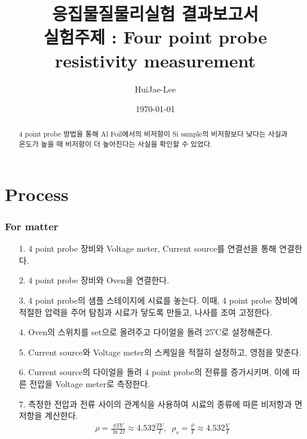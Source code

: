 \documentclass[aps,reprint,superscriptaddress,10pt]{revtex4-2}
\begin{document}
\title{응집물질물리실험 결과보고서 \\
\small 실험주제 : Four point probe resistivity
measurement}

\author{HuiJae-Lee}

\date{\today}

\begin{abstract}
4  point probe 방법을 통해 Al Foil에서의 비저항이 Si sample의 비저항보다 낮다는
사실과 온도가 높을 때 비저항이 더 높아진다는 사실을 확인할 수 있었다.
  \end{abstract}

 \maketitle
 
 \section{Process}
 \subsubsection{For matter}
 \begin{itemize}
     \item[1. ]
     4 point probe 장비와 Voltage meter, Current source를 연결선을 통해 연결한다.
     \item[2. ]
     4 point probe 장비와 Oven을 연결한다.
     \item[3. ]
     4 point probe의 샘플 스테이지에 시료를 놓는다. 이때, 4 point probe 장비에 
     적절한 압력을 주어 탐침과 시료가 닿도록 만들고, 나사를 조여 고정한다. 
     \item[4. ]
     Oven의 스위치를 set으로 올려주고 다이얼을 돌려 25℃로 설정해준다.
     \item[5. ]
     Current source와 Voltage meter의 스케일을 적절히 설정하고, 영점을 맞춘다.
     \item[6. ]
     Current source의 다이얼을 돌려 4 point probe의 전류를 증가시키며, 
     이에 따른 전압을 Voltage meter로 측정한다.
     \item[7. ] 
     측정한 전압과 전류 사이의 관계식을 사용하여 시료의 종류에 
     따른 비저항과 면저항을 계산한다. 
     \begin{align}
         \rho = \frac{\pi TV}{\ln{2I}}\approx 4.532\frac{TV}{I},\,\,\,
         \rho_s = \frac{\rho}{T}\approx 4.532\frac{V}{I}
     \end{align}
 
 \end{itemize}
 
\end{document}
